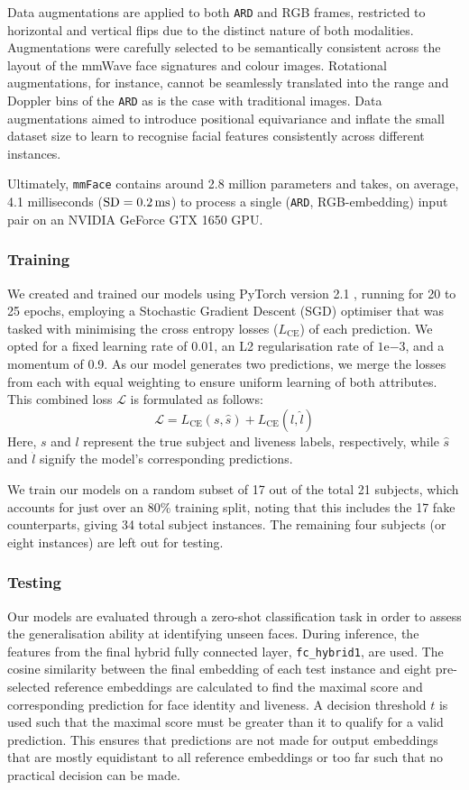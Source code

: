 \documentclass{mpaper}
\begin{document}
Data augmentations are applied to both \texttt{ARD} and RGB frames, restricted to horizontal and vertical flips due to the distinct nature of both modalities. Augmentations were carefully selected to be semantically consistent across the layout of the mmWave face signatures and colour images. Rotational augmentations, for instance, cannot be seamlessly translated into the range and Doppler bins of the \texttt{ARD} as is the case with traditional images. Data augmentations aimed to introduce positional equivariance and inflate the small dataset size to learn to recognise facial features consistently across different instances.

Ultimately, \texttt{mmFace} contains around 2.8 million parameters and takes, on average, 4.1 milliseconds ($\text{SD}=\text{\qty{0.2}{\ms}}$) to process a single (\texttt{ARD}, RGB-embedding) input pair on an NVIDIA GeForce GTX 1650 GPU.

\subsubsection{Training}
We created and trained our models using PyTorch version 2.1 \cite{paszke2019pytorch}, running for 20 to 25 epochs, employing a Stochastic Gradient Descent (SGD) optimiser that was tasked with minimising the cross entropy losses ($L_{\text{CE}}$) of each prediction. We opted for a fixed learning rate of 0.01, an L2 regularisation rate of $1\mathrm{e}{-3}$, and a momentum of 0.9. As our model generates two predictions, we merge the losses from each with equal weighting to ensure uniform learning of both attributes. This combined loss $\mathcal{L}$ is formulated as follows:
$$\mathcal{L} = L_{\text{CE}}(s, \hat{s}) + L_{\text{CE}}(l, \hat{l})$$
Here, $s$ and $l$ represent the true subject and liveness labels, respectively, while $\hat{s}$ and $\hat{l}$ signify the model's corresponding predictions. 

We train our models on a random subset of 17 out of the total 21 subjects, which accounts for just over an 80\% training split, noting that this includes the 17 fake counterparts, giving 34 total subject instances. The remaining four subjects (or eight instances) are left out for testing.

\subsubsection{Testing}
Our models are evaluated through a zero-shot classification task in order to assess the generalisation ability at identifying unseen faces. During inference, the features from the final hybrid fully connected layer, \texttt{fc\_hybrid1}, are used. The cosine similarity between the final embedding of each test instance and eight pre-selected reference embeddings are calculated to find the maximal score and corresponding prediction for face identity and liveness. A decision threshold $t$ is used such that the maximal score must be greater than it to qualify for a valid prediction. This ensures that predictions are not made for output embeddings that are mostly equidistant to all reference embeddings or too far such that no practical decision can be made.
\end{document}

